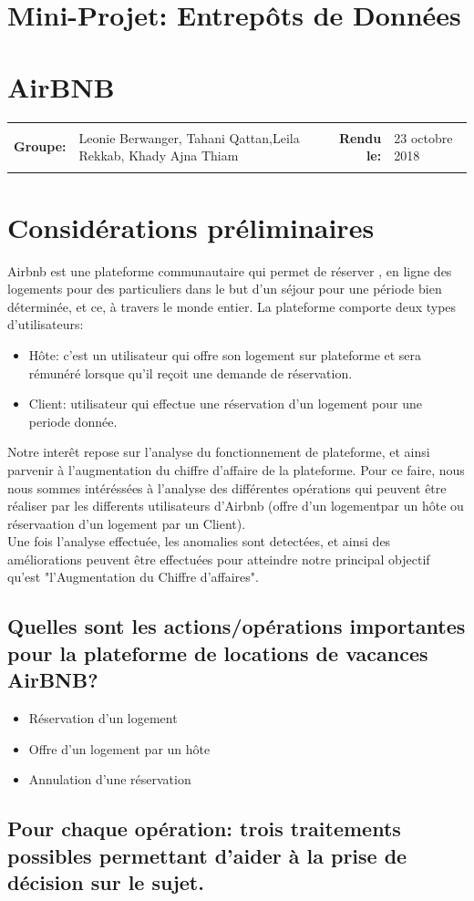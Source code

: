 \documentclass[11pt]{article}
\newcommand{\metaInfo}[4]{
	\begin{tabularx}{\textwidth}{rXrl}
	\hline \\
	\textbf{Groupe:}	& #1 &  \textbf{Rendu le:}   & #2 \\
	\\ \hline
	\end{tabularx}
}
\newcommand{\heading}[2]{
	\begin{center}
	\section*{#1}
	\section*{#2}
	\end{center}
}
\begin{document}
\heading{Mini-Projet: Entrepôts de Données}{AirBNB}
\metaInfo{Leonie Berwanger, Tahani Qattan,\newline Leila Rekkab, Khady Ajna Thiam}{23 octobre 2018}

\section{}
\section{Considérations préliminaires}
Airbnb est une plateforme communautaire qui permet de réserver , en ligne des logements pour des particuliers dans le but d’un séjour pour une période bien déterminée, et ce, à travers le monde entier. 
La plateforme comporte deux types d'utilisateurs:
\begin{itemize}
	\item Hôte: c'est un utilisateur qui offre son logement sur plateforme et sera rémunéré lorsque qu'il reçoit une demande de réservation.
	\item Client: utilisateur qui effectue une réservation d'un logement pour une periode donnée. 
\end{itemize}
Notre interêt repose sur l'analyse du fonctionnement de plateforme, et ainsi parvenir à l'augmentation du chiffre d'affaire de la plateforme. Pour ce faire, nous nous sommes intéréssées à l'analyse des différentes opérations qui peuvent être réaliser par les differents utilisateurs d'Airbnb (offre d'un logementpar un hôte ou réservaation d'un logement par un Client).\\
Une fois l'analyse effectuée, les anomalies sont detectées, et ainsi des améliorations peuvent être effectuées pour atteindre notre principal objectif qu'est "l'Augmentation du Chiffre d'affaires".

\subsection{Quelles sont les actions/opérations importantes pour la plateforme de locations de vacances AirBNB?}
\begin{itemize}
	\item Réservation d'un logement
	\item Offre d'un logement par un hôte
	\item Annulation d'une réservation
\end{itemize}
\subsection{Pour chaque opération: trois traitements possibles permettant d’aider à la prise de décision sur le sujet.}
\end{document}
